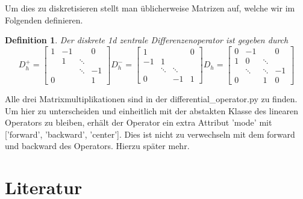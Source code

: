 \documentclass[a4paper,10pt]{article}
\newtheorem{dfn}{Definition}
\begin{document}
Um dies zu diskretisieren stellt man üblicherweise Matrizen auf, welche wir im Folgenden definieren.
\begin{dfn}
	Der diskrete 1d zentrale Differenzenoperator ist gegeben durch 
	 \[
	 D_h^+ = \begin{bmatrix} 
	 1 & -1 &         &  0 \\
	   & 1  &  \ddots &    \\
	   &    & \ddots  & -1 \\
	 0 &    &         &  1 
	 \end{bmatrix}
		D_h^- = \begin{bmatrix} 
		1  &        &        & 0 \\
		-1 & 1      &        &   \\
		   & \ddots & \ddots &    \\
		0  &        & -1     & 1 
		\end{bmatrix}
	D_h = \begin{bmatrix} 
	0 & -1 &  & 0 \\
	1 & 0 &  \ddots & \\
	& \ddots & \ddots & -1 \\
	0 &      & 1 & 0 
	\end{bmatrix}
	\]
\end{dfn}
Alle drei Matrixmultiplikationen sind in der differential\_operator.py zu finden. Um hier zu unterscheiden und einheitlich mit der abstakten Klasse des linearen Operators zu bleiben, erhält der Operator ein extra Attribut 'mode' mit ['forward', 'backward', 'center']. Dies ist nicht zu verwechseln mit dem forward und backward des Operators. Hierzu später mehr.





\section*{Literatur}

	\label{LastPage}
\end{document}
